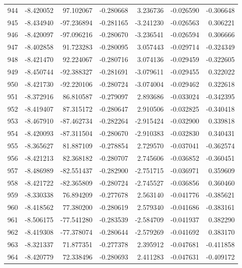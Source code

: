 \begin{tabular}{rrrrrrr}
 944 &  -8.420052 &   97.102067 & -0.280668 &    3.236736 &   -0.026590 & -0.306648 \\
 945 &  -8.434940 &  -97.236894 & -0.281165 &   -3.241230 &   -0.026563 &  0.306221 \\
 946 &  -8.420097 &  -97.096216 & -0.280670 &   -3.236541 &   -0.026594 &  0.306666 \\
 947 &  -8.402858 &   91.723283 & -0.280095 &    3.057443 &   -0.029714 & -0.324349 \\
 948 &  -8.421470 &   92.224067 & -0.280716 &    3.074136 &   -0.029459 & -0.322605 \\
 949 &  -8.450744 &  -92.388327 & -0.281691 &   -3.079611 &   -0.029455 &  0.322022 \\
 950 &  -8.421730 &  -92.220106 & -0.280724 &   -3.074004 &   -0.029462 &  0.322618 \\
 951 &  -8.372916 &   86.810587 & -0.279097 &    2.893686 &   -0.033024 & -0.342395 \\
 952 &  -8.419407 &   87.315172 & -0.280647 &    2.910506 &   -0.032825 & -0.340418 \\
 953 &  -8.467910 &  -87.462734 & -0.282264 &   -2.915424 &   -0.032900 &  0.339818 \\
 954 &  -8.420093 &  -87.311504 & -0.280670 &   -2.910383 &   -0.032830 &  0.340431 \\
 955 &  -8.365627 &   81.887109 & -0.278854 &    2.729570 &   -0.037041 & -0.362574 \\
 956 &  -8.421213 &   82.368182 & -0.280707 &    2.745606 &   -0.036852 & -0.360451 \\
 957 &  -8.486989 &  -82.551437 & -0.282900 &   -2.751715 &   -0.036971 &  0.359609 \\
 958 &  -8.421722 &  -82.365809 & -0.280724 &   -2.745527 &   -0.036856 &  0.360460 \\
 959 &  -8.330338 &   76.894209 & -0.277678 &    2.563140 &   -0.041776 & -0.385621 \\
 960 &  -8.418562 &   77.380200 & -0.280619 &    2.579340 &   -0.041686 & -0.383161 \\
 961 &  -8.506175 &  -77.541280 & -0.283539 &   -2.584709 &   -0.041937 &  0.382290 \\
 962 &  -8.419308 &  -77.378074 & -0.280644 &   -2.579269 &   -0.041692 &  0.383170 \\
 963 &  -8.321337 &   71.877351 & -0.277378 &    2.395912 &   -0.047681 & -0.411858 \\
 964 &  -8.420779 &   72.338496 & -0.280693 &    2.411283 &   -0.047631 & -0.409172 \\

\end{tabular}
